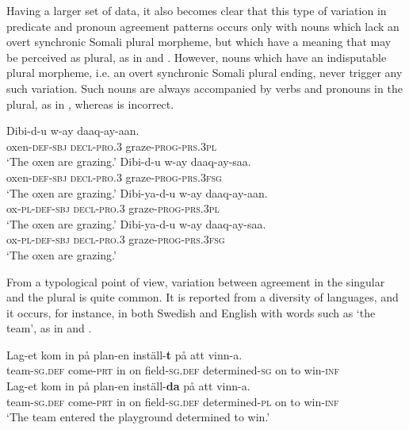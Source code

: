 \documentclass[output=paper]{langsci/langscibook}
\begin{document}
Having a larger set of data, it also becomes clear that this type of variation in predicate and pronoun agreement patterns occurs only with nouns which lack an overt synchronic Somali plural morpheme, but which have a meaning that may be perceived as plural, as in  and . However, nouns which have an indisputable plural morpheme, i.e. an overt synchronic Somali plural ending, never trigger any such variation. Such nouns are always accompanied by verbs and pronouns in the plural, as in , whereas  is incorrect.

\ea\label{ex:nilsson:4}
\ea\label{ex:nilsson:4a}
\gll Dibi-d-u     w-ay     daaq-ay-aan.\\
       oxen-\textsc{def-sbj}   \textsc{decl-pro.3}  graze-\textsc{prog-prs.3pl}\\
\glt ‘The oxen are grazing.’
\ex\label{ex:nilsson:4b}
\gll Dibi-d-u    w-ay    daaq-ay-saa.\\
       oxen\textsc{-def-sbj}   \textsc{decl-pro.3}  graze-\textsc{prog-prs.3fsg}\\
\glt ‘The oxen are grazing.’
\ex\label{ex:nilsson:4c}
\gll Dibi-ya-d-u    w-ay    daaq-ay-aan.\\
       ox\textsc{-pl-def-sbj}   \textsc{decl-pro.3}  graze-\textsc{prog-prs.3pl}\\
\glt ‘The oxen are grazing.’
\ex\label{ex:nilsson:4d}
\gll *Dibi-ya-d-u    w-ay    daaq-ay-saa.\\
       ox\textsc{-pl-def-sbj}    \textsc{decl-pro.3}  graze\textsc{-prog-prs.3fsg}\\
\glt ‘The oxen are grazing.’
\z
\z

From a typological point of view, variation between agreement in the singular and the plural is quite common. It is reported from a diversity of languages, and it occurs, for instance, in both Swedish and English with words such as ‘the team’, as in  and .

\ea\label{ex:nilsson:5}
\ea 
\gll Lag-et           kom          in på plan-en        inställ-\textbf{t}            på att vinn-a.\\
       team-\textsc{sg.def} come-\textsc{prt} in on field-\textsc{sg.def} determined-\textsc{sg} on to  win-\textsc{inf}\\

\ex
\gll Lag-et           kom          in på plan-en        inställ-\textbf{da}        på att vinn-a.\\
       team-\textsc{sg.def}  come-\textsc{prt} in on field-\textsc{sg.def} determined-\textsc{pl} on to  win-\textsc{inf} \\
\glt ‘The team entered the playground determined to win.’
\z
\z
\end{document}
